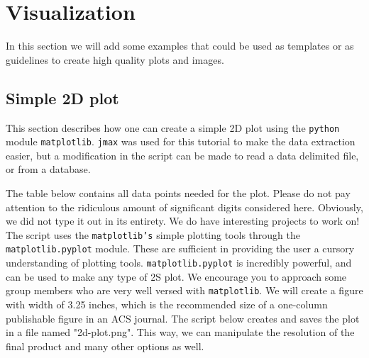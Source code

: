 \documentclass[11pt]{article}
\begin{document}
\section{Visualization}
\label{sec:org90c63cf}
In this section we will add some examples that could be used as templates or as guidelines to create high quality plots and images. 
\subsection{Simple 2D plot}
\label{sec:org465d37d}
This section describes how one can create a simple 2D plot using the \texttt{python} module \texttt{matplotlib}. \texttt{jmax} was used for this tutorial to make the data extraction easier, but a modification in the script can be made to read a data delimited file, or from a database.

The table below contains all data points needed for the plot. Please do not pay attention to the ridiculous amount of significant digits considered here. Obviously, we did not type it out in its entirety. We do have interesting projects to work on! The script uses the \texttt{matplotlib's} simple plotting tools through the \texttt{matplotlib.pyplot} module. These are sufficient in providing the user a cursory understanding of plotting tools. \texttt{matplotlib.pyplot} is incredibly powerful, and can be used to make any type of 2S plot. We encourage you to approach some group members who are very well versed with \texttt{matplotlib}. We will create a figure with width of 3.25 inches, which is the recommended size of a one-column publishable figure in an ACS journal. The script below creates and saves the plot in a file named "2d-plot.png". This way, we can manipulate the resolution of the final product and many other options as well.
\end{document}
